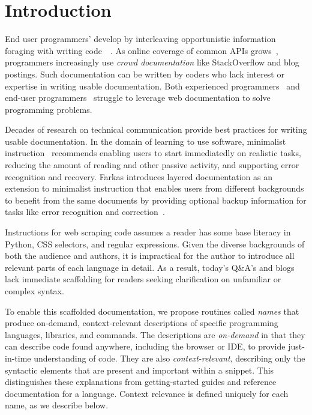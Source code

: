 \section{Introduction}

End user programmers' develop by interleaving opportunistic information foraging with writing code~\cite{brandt_two_2009}~\cite{brandt_example-centric_2010}.
As online coverage of common APIs grows~\cite{parnin_measuring_2011}, programmers increasingly use \emph{crowd documentation} like StackOverflow and blog postings.
Such documentation can be written by coders who lack interest or expertise in writing usable documentation.
Both experienced programmers~\cite{duala-ekoko_asking_2012} and end-user programmers~\cite{dorn_lost_2013}\cite{dorn_learning_2010} struggle to leverage web documentation to solve programming problems.

Decades of research on technical communication provide best practices for writing usable documentation.
In the domain of learning to use software, minimalist instruction~\cite{carroll_nurnberg_1990} recommends enabling users to start immediatedly on realistic tasks, reducing the amount of reading and other passive activity, and supporting error recognition and recovery.
Farkas introduces layered documentation as an extension to minimalist instruction that enables users from different backgrounds to benefit from the same documents by providing optional backup information for tasks like error recognition and correction~\cite{farkas_layering_1998}.

Instructions for web scraping code assumes a reader has some base literacy in Python, CSS selectors, and regular expressions.
Given the diverse backgrounds of both the audience and authors, it is impractical for the author to introduce all relevant parts of each language in detail.
As a result, today's Q\&A's and blogs lack immediate scaffolding for readers seeking clarification on unfamiliar or complex syntax.

To enable this scaffolded documentation, we propose routines called \emph{\Glspl{name}} that produce on-demand, context-relevant descriptions of specific programming languages, libraries, and commands.
The descriptions are \emph{on-demand} in that they can describe code found anywhere, including the browser or IDE, to provide just-in-time understanding of code.
They are also \emph{context-relevant}, describing only the syntactic elements that are present and important within a snippet.
This distinguishes these explanations from getting-started guides and reference documentation for a language.
Context relevance is defined uniquely for each \gls{name}, as we describe below.

